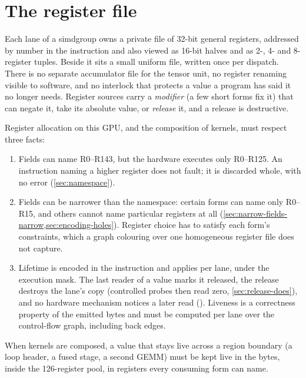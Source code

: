 \chapter{The register file}\label{ch:register-file}

Each lane of a simdgroup owns a private file of 32-bit general registers, addressed by number in the instruction and
also viewed as 16-bit halves and as 2-, 4- and 8-register tuples. Beside it sits a small uniform file, written once per
dispatch. There is no separate accumulator file for the tensor unit, no register renaming visible to software, and no
interlock that protects a value a program has said it no longer needs. Register sources carry a \emph{modifier} (a few short forms fix it) that can negate it, take its absolute value, or \emph{release} it,
and a release is destructive.

Register allocation on this GPU, and the composition of kernels, must respect three facts:

\begin{enumerate}
\def\labelenumi{\arabic{enumi}.}
\item Fields can name R0–R143, but the hardware executes only R0–R125. An instruction naming a higher register does
  not fault; it is discarded whole, with no error (\cref{sec:namespace}).
\item Fields can be narrower than the namespace: certain forms can name only R0–R15, and others cannot name
  particular registers at all (\cref{sec:narrow-fields-narrow,sec:encoding-holes}). Register choice has to satisfy each form's
  constraints, which a graph colouring over one homogeneous register file does not capture.
\item Lifetime is encoded in the instruction and applies per lane, under the execution mask. The last reader of a value
  marks it released,
  the release destroys the lane's copy (controlled probes then read zero, \cref{sec:release-does}), and no hardware mechanism
  notices a later read (). Liveness is a correctness property of the emitted
  bytes and must be computed per lane over the control-flow graph, including back edges.
\end{enumerate}

When kernels are composed, a value that stays live across a region boundary (a loop header, a fused stage, a
second GEMM) must be kept live in the bytes, inside the 126-register pool, in registers every consuming form can name.

